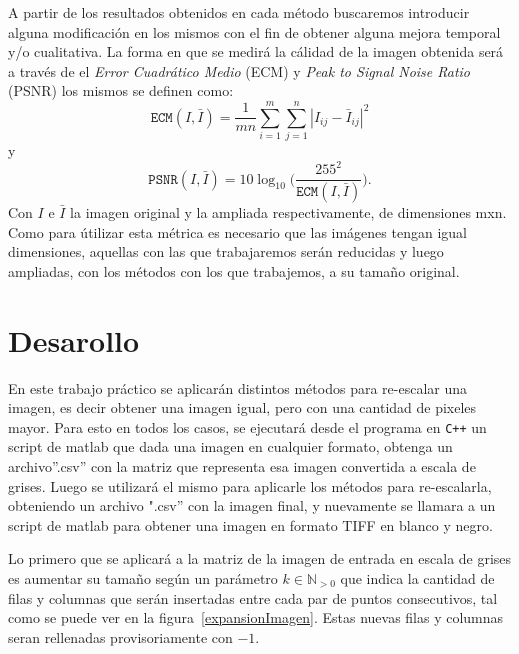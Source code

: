 \documentclass[a4paper]{article}
\newcounter{col}
\begin{document}
A partir de los resultados obtenidos en cada método buscaremos introducir alguna modificación en los mismos con el fin de obtener alguna mejora temporal y/o cualitativa. La forma en que se medirá la cálidad de la imagen obtenida será a través de el \emph{Error Cuadr\'atico Medio} (ECM) y \emph{Peak to Signal Noise Ratio} (PSNR) los mismos se definen como:
\begin{equation}
\texttt{ECM}(I,\bar{I}) = \frac{1}{mn}\sum_{i=1}^m\sum_{j = 1}^n |I_{ij} - \bar{I}_{ij}|^2 \label{eq:ecm}
\end{equation}
\noindent y
\begin{equation}
\texttt{PSNR}(I,\bar{I}) = 10 \log_{10}\bigg(\frac{255^2}{\texttt{ECM}(I,\bar{I})}\bigg). \label{eq:psnr}
\end{equation}  
Con $I$ e $\bar{I}$ la imagen original y la ampliada respectivamente, de dimensiones mxn. Como para útilizar esta métrica es necesario que las imágenes tengan igual dimensiones, aquellas con las que trabajaremos serán reducidas y luego ampliadas, con los métodos con los que trabajemos, a su tamaño original. 


\newpage 

\section{Desarollo}

En este trabajo pr\'actico se aplicar\'an distintos métodos para re-escalar una imagen, es decir obtener una imagen igual, pero con una cantidad de pixeles mayor. Para esto en todos los casos, se ejecutar\'a desde el programa en \verb-C++- un script de matlab que dada una imagen en cualquier formato, obtenga un archivo''.csv'' con la matriz que representa esa imagen convertida a escala de grises. Luego se utilizar\'a el mismo para aplicarle los métodos para re-escalarla, obteniendo un archivo ".csv'' con la imagen final, y nuevamente se llamara a un script de matlab para obtener una imagen en formato TIFF en blanco y negro.

Lo primero que se aplicar\'a a la matriz de la imagen de entrada en escala de grises es aumentar su tamaño según un parámetro $k \in \mathbb{N}_{>0}$ que indica la cantidad de filas y columnas que ser\'an insertadas entre cada par de puntos consecutivos, tal como se puede ver en la figura~\ref{expansionImagen}. Estas nuevas filas y columnas seran rellenadas provisoriamente con $ -1 $.
\end{document}
